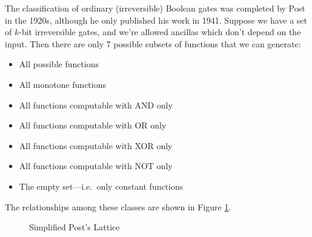 \documentclass[12pt]{report}
\theoremstyle{plain}
\theoremstyle{definition}
\begin{document}
The classification of ordinary (irreversible) Boolean gates was completed by Post \cite{PostsLattice} in the 1920s, although he only published his work in 1941. Suppose we have a set of $k$-bit irreversible gates, and we're allowed ancillas which don't depend on the input. Then there are only 7 possible subsets of functions that we can generate:
\begin{itemize}
\item All possible functions
\item All monotone functions
\item All functions computable with AND only
\item All functions computable with OR only
\item All functions computable with XOR only
\item All functions computable with NOT only
\item The empty set---i.e.\ only constant functions
\end{itemize}
The relationships among these classes are shown in Figure \ref{post}.
\begin{figure}[h]
\begin{center}
\end{center}
\caption{Simplified Post's Lattice}
\label{post}
\end{figure}
\end{document}
